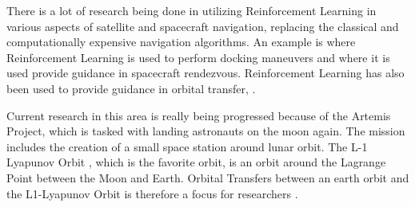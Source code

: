 There is a lot of research being done in utilizing Reinforcement Learning in various aspects of satellite and spacecraft navigation, replacing the classical and computationally expensive navigation algorithms. An example is \cite{oestreich2020autonomous} where Reinforcement Learning is used to perform docking maneuvers and \cite{broida2019spacecraft} where it is used provide guidance in spacecraft rendezvous. Reinforcement Learning has also been used to provide guidance in orbital transfer, \cite{miller2019low}.

Current research in this area is really being progressed because of the Artemis Project, which is tasked with landing astronauts on the moon again. The mission includes the creation of a small space station around lunar orbit. The L-1 Lyapunov Orbit \cite{rubinsztejn_2019}, which is the favorite orbit, is an orbit around the Lagrange Point between the Moon and Earth. Orbital Transfers between an earth orbit and the L1-Lyapunov Orbit is therefore a focus for researchers \cite{sullivan2020using, lafarge2020guidance, lafarge2020autonomous}. 
